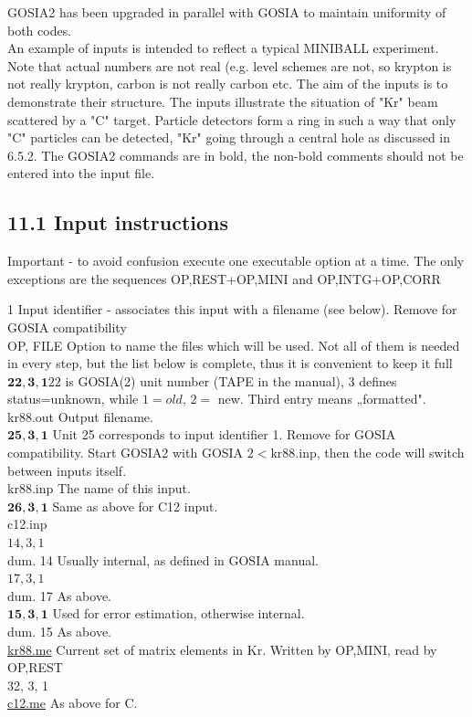 \documentclass[10pt]{article}
\begin{document}
GOSIA2 has been upgraded in parallel with GOSIA to maintain uniformity of both codes.\\
An example of inputs is intended to reflect a typical MINIBALL experiment. Note that actual numbers are not real (e.g. level schemes are not, so krypton is not really krypton, carbon is not really carbon etc. The aim of the inputs is to demonstrate their structure. The inputs illustrate the situation of "Kr" beam scattered by a "C" target. Particle detectors form a ring in such a way that only "C" particles can be detected, "Kr" going through a central hole as discussed in 6.5.2. The GOSIA2 commands are in bold, the non-bold comments should not be entered into the input file.

\subsection*{11.1 Input instructions}
Important - to avoid confusion execute one executable option at a time. The only exceptions are the sequences OP,REST+OP,MINI and OP,INTG+OP,CORR

1 Input identifier - associates this input with a filename (see below). Remove for GOSIA compatibility\\
OP, FILE Option to name the files which will be used. Not all of them is needed in every step, but the list below is complete, thus it is convenient to keep it full\\
$\mathbf{2 2}, \mathbf{3}, \mathbf{1} 22$ is GOSIA(2) unit number (TAPE in the manual), 3 defines status=unknown, while $1=o l d$, $2=$ new. Third entry means „formatted".\\
kr88.out Output filename.\\
$\mathbf{2 5}, \mathbf{3}, \mathbf{1}$ Unit 25 corresponds to input identifier 1. Remove for GOSIA compatibility. Start GOSIA2 with GOSIA $2<\mathrm{kr} 88 . \mathrm{inp}$, then the code will switch between inputs itself.\\
kr88.inp The name of this input.\\
$\mathbf{2 6}, \mathbf{3}, \mathbf{1}$ Same as above for C12 input.\\
c12.inp\\
$14,3,1$\\
dum. 14 Usually internal, as defined in GOSIA manual.\\
$17,3,1$\\
dum. 17 As above.\\
$\mathbf{1 5}, \mathbf{3}, \mathbf{1}$ Used for error estimation, otherwise internal.\\
dum. 15 As above.\\
\href{http://kr88.me}{kr88.me} Current set of matrix elements in Kr. Written by OP,MINI, read by OP,REST\\
32, 3, 1\\
\href{http://c12.me}{c12.me} As above for C.
\end{document}
